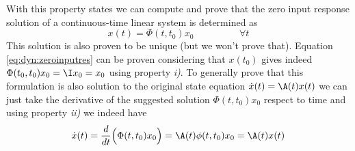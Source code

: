 	With this property states we can compute and prove that the zero input response solution of a continuous-time linear system is determined as
	\begin{equation} \label{eq:dyn:zeroinputres}
		x(t) = \Phi(t,t_0) x_0 \hspace{2cm} \forall t 
	\end{equation}
	This solution is also proven to be unique (but we won't prove that). Equation \ref{eq:dyn:zeroinputres} can be proven considering that $x(t_0)$ gives indeed $\Phi(t_0,t_0) x_0 = \I x_0 = x_0$ using property \textit{i)}. To generally prove that this formulation is also solution to the original state equation $\dot x(t) = \A(t) x(t)$ we can just take the derivative of the suggested solution $\Phi(t,t_0) x_0$ respect to time and using property \textit{ii)} we indeed have
	\[ \dot x(t) = \frac{d}{dt}\Big( \Phi(t,t_0) x_0 \Big) = \A(t) \phi(t,t_0) x_0 = \A(t) x(t) \]
	
